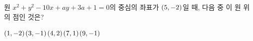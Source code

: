 원 $x^2+y^2-10x+ay+3a+1=0$의 중심의 좌표가 $(5{,}\mkern3mu\mathopen{}-2)$일 때, 다음 중 이 원 위의 점인 것은? 
\begin{choices32}{$(1{,}\mkern3mu\mathopen{}-2)$}{$(3{,}\mkern3mu\mathopen{}-1)$}{$(4{,}\mkern3mu\mathopen{}2)$}{$(7{,}\mkern3mu\mathopen{}1)$}{$(9{,}\mkern3mu\mathopen{}-1)$}\end{choices32}
